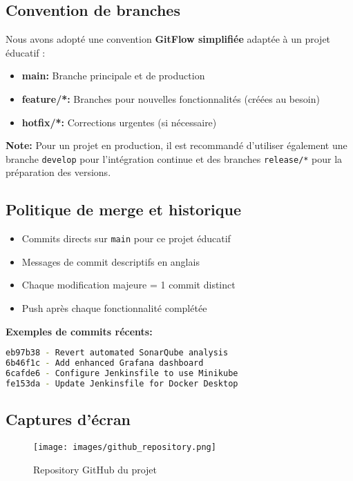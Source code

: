 \documentclass[12pt,a4paper]{article}
\begin{document}
\subsection{Convention de branches}
Nous avons adopté une convention \textbf{GitFlow simplifiée} adaptée à un projet éducatif :

\begin{tcolorbox}[colback=green!5!white,colframe=green!75!black,title=Structure des branches]
    \begin{itemize}
        \item \textbf{main:} Branche principale et de production
        \item \textbf{feature/*:} Branches pour nouvelles fonctionnalités (créées au besoin)
        \item \textbf{hotfix/*:} Corrections urgentes (si nécessaire)
    \end{itemize}
\end{tcolorbox}

\textbf{Note:} Pour un projet en production, il est recommandé d'utiliser également une branche \texttt{develop} pour l'intégration continue et des branches \texttt{release/*} pour la préparation des versions.

\subsection{Politique de merge et historique}
\begin{itemize}
    \item Commits directs sur \texttt{main} pour ce projet éducatif
    \item Messages de commit descriptifs en anglais
    \item Chaque modification majeure = 1 commit distinct
    \item Push après chaque fonctionnalité complétée
\end{itemize}

\textbf{Exemples de commits récents:}
\begin{lstlisting}[language=bash]
eb97b38 - Revert automated SonarQube analysis
6b46f1c - Add enhanced Grafana dashboard
6cafde6 - Configure Jenkinsfile to use Minikube
fe153da - Update Jenkinsfile for Docker Desktop
\end{lstlisting}

\subsection{Captures d'écran}
\begin{figure}[H]
    \centering
    \texttt{[image: images/github\_repository.png]}
    \caption{Repository GitHub du projet}
    \label{fig:github_repo}
\end{figure}
\end{document}
